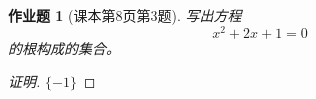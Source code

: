 \documentclass{article}
\begin{document}
\begin{CJK}{UTF8}{gbsn}
\newtheorem{Ex}{作业题}
\begin{Ex}[课本第8页第3题]
\mbox{} \par \noindent
写出方程
\begin{equation*}
x^2+2x+1=0
\end{equation*}
的根构成的集合。
\end{Ex}
\begin{proof}[证明]
$\{-1\}$
\end{proof}
\end{CJK}
\end{document}

